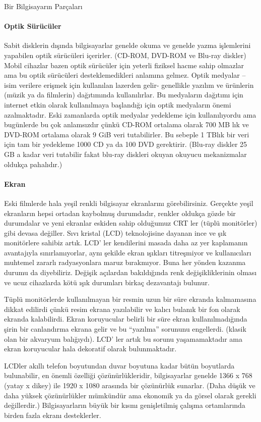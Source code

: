 \documentclass[10pt,a5paper]{book}
\begin{document}
\begin{section}{Bir Bilgisayarın Parçaları}
\paragraph{Optik Sürücüler}{Sabit disklerin dışında bilgisayarlar genelde okuma ve genelde yazma işlemlerini yapabilen optik sürücüleri içerirler. (CD-ROM, DVD-ROM ve Blu-ray diskler) Mobil cihazlar bazen optik sürücüler için yeterli fiziksel hacme sahip olmazlar ama bu optik sürücüleri desteklemedikleri anlamına gelmez. Optik medyalar – isim verilere erişmek için kullanılan lazerden gelir- genellikle yazılım ve ürünlerin (müzik ya da filmlerin) dağıtımında kullanılırlar. Bu medyaların dağıtımı için internet etkin olarak kullanılmaya başlandığı için optik medyaların önemi azalmaktadır.}
Eski zamanlarda optik medyalar yedekleme için kullanılıyordu ama bugünlerde bu çok anlamsızdır çünkü CD-ROM ortalama olarak 700 MB lık ve DVD-ROM ortalama olarak 9 GiB veri tutabilirler. Bu sebeple 1 TBlık bir veri için tam bir yedekleme 1000 CD ya da 100 DVD gerektirir. (Blu-ray diskler 25 GB a kadar veri tutabilir fakat blu-ray diskleri okuyan okuyucu mekanizmalar oldukça pahalıdır.)
\paragraph{Ekran}{Eski filmlerde hala yeşil renkli bilgisayar ekranlarını görebilirsiniz. Gerçekte yeşil ekranların hepsi ortadan kaybolmuş durumdadır, renkler oldukça gözde bir durumdalar ve yeni ekranlar eskiden sahip olduğumuz CRT ler (tüplü monitörler) gibi devasa değiller. Sıvı kristal (LCD) teknolojisine dayanan ince ve şık monitörlere sahibiz artık. LCD' ler kendilerini masada daha az yer kaplamanın avantajıyla sınırlamıyorlar, aynı şekilde ekran ışıkları titreşmiyor ve kullanıcıları muhtemel zararlı radyasyonlara maruz bırakmıyor. Buna her yönden kazanma durumu da diyebiliriz.  Değişik açılardan bakıldığında renk değişikliklerinin olması ve ucuz cihazlarda kötü ışık durumları birkaç dezavantajı bulunur.}

Tüplü monitörlerde kullanılmayan bir resmin uzun bir süre ekranda kalmamasına dikkat edilirdi çünkü resim ekrana yazılabilir ve kalıcı bulanık bir fon olarak ekranda kalabilirdi. Ekran koruyucular belirli bir süre ekran kullanılmadığında şirin bir canlandırma ekrana gelir ve bu “yazılma” sorununu engellerdi. (klasik olan bir akvaryum balığıydı). LCD' ler artık bu sorunu yaşamamaktadır ama ekran koruyucular hala dekoratif olarak bulunmaktadır.

LCDler akıllı telefon boyutundan duvar boyutuna kadar bütün boyutlarda bulunabilir, en önemli özelliği çözünürlükleridir, bilgisayarlar genelde 1366 x 768 (yatay x dikey) ile 1920 x 1080 arasında bir çözünürlük sunarlar. (Daha düşük ve daha yüksek çözünürlükler mümkündür ama ekonomik ya da görsel olarak gerekli değillerdir.) Bilgisayarların büyük bir kısmı genişletilmiş çalışma ortamlarında birden fazla ekranı desteklerler.


\end{section}
\end{document}

